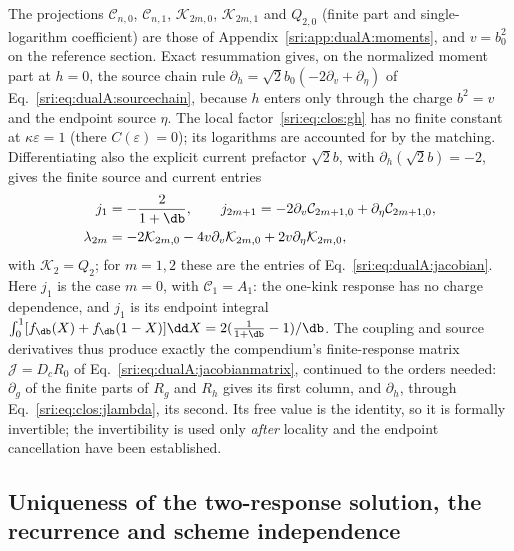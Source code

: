 The projections $\mathcal C_{n,0}$, $\mathcal C_{n,1}$, $\mathcal K_{2m,0}$, $\mathcal K_{2m,1}$ and $Q_{2,0}$ (finite
part and single-logarithm coefficient) are those of Appendix~\ref{sri:app:dualA:moments}, and $v=b_0^2$ on the reference
section. Exact resummation gives, on the normalized moment part at $h=0$, the source chain rule
$\partial_h=\sqrt2b_0(-2\partial_v+\partial_\eta)$ of Eq.~\eqref{sri:eq:dualA:sourcechain}, because $h$ enters only through
the charge $b^2=v$ and the endpoint source $\eta$. The local factor~\eqref{sri:eq:clos:gh} has no
finite constant at $\kappa\varepsilon=1$ (there $C(\varepsilon)=0$); its logarithms are accounted for by the matching.
Differentiating also the explicit current prefactor $\sqrt2b$, with $\partial_h(\sqrt2b)=-2$, gives the finite
source and current entries
\begin{equation}
\begin{aligned}
 j_1&=-\frac2{1+\db},\qquad
 j_{2m+1}=-2\partial_v\mathcal C_{2m+1,0}+\partial_\eta\mathcal C_{2m+1,0},\\
 \lambda_{2m}&=-2\mathcal K_{2m,0}-4v\partial_v\mathcal K_{2m,0}+2v\partial_\eta\mathcal K_{2m,0},
\end{aligned}
 \label{sri:eq:clos:jlambda}
\end{equation}
with $\mathcal K_2=Q_2$; for $m=1,2$ these are the entries of Eq.~\eqref{sri:eq:dualA:jacobian}. Here $j_1$ is the case
$m=0$, with $\mathcal C_1=A_1$: the one-kink response has no charge
dependence, and $j_1$ is its endpoint integral $\int_0^1[f_{\db}(X)+f_{\db}(1-X)]\dd X=2(\frac1{1+\db}-1)/\db$. The
coupling and source derivatives thus produce exactly the compendium's finite-response matrix $\mathcal J=D_cR_0$ of
Eq.~\eqref{sri:eq:dualA:jacobianmatrix}, continued to the orders needed: $\partial_g$ of the finite parts of $R_g$ and $R_h$
gives its first column, and $\partial_h$, through Eq.~\eqref{sri:eq:clos:jlambda}, its second. Its free value is the
identity, so it is formally invertible; the invertibility is used only \emph{after} locality and the endpoint cancellation have
been established.

\subsection{Uniqueness of the two-response solution, the recurrence and scheme independence}\label{sri:app:clos:uniqueness}
